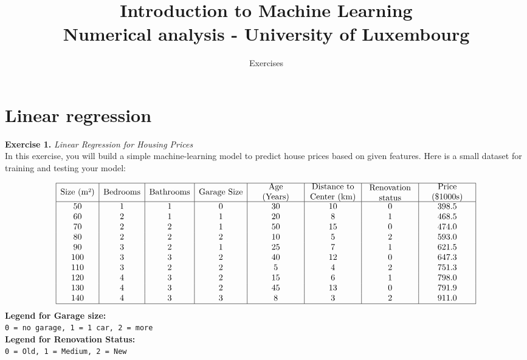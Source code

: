 \documentclass{article}
\title{Introduction to Machine Learning \\[1ex] \large Numerical analysis - University of Luxembourg}
\author{Exercises}
\date{}
\begin{document}
\maketitle


\section*{Linear regression}

\noindent \textbf{Exercise 1.} \textit{Linear Regression for Housing Prices} \\

In this exercise, you will build a simple machine-learning model to predict house prices based on given features. Here is a small dataset for training and testing your model:

\[
\begin{array}{|c|c|c|c|c|c|c|c|}
\hline
\text{Size (m²)} & \text{Bedrooms} & \text{Bathrooms} & \text{Garage Size} & \parbox[c]{2cm}{\centering Age \\ (Years)} & 
\parbox[c]{2cm}{\centering Distance to\\ Center (km)} & \parbox[c]{2cm}{\centering Renovation\\ status} & \parbox[c]{2cm}{\centering Price\\ (\$1000s)} \\
\hline
50  & 1 & 1 & 0 & 30 & 10 & 0 & 398.5  \\
60  & 2 & 1 & 1 & 20 & 8  & 1 & 468.5  \\
70  & 2 & 2 & 1 & 50 & 15 & 0 & 474.0  \\
80  & 2 & 2 & 2 & 10 & 5  & 2 & 593.0  \\
90  & 3 & 2 & 1 & 25 & 7  & 1 & 621.5  \\
100 & 3 & 3 & 2 & 40 & 12 & 0 & 647.3  \\
110 & 3 & 2 & 2 & 5  & 4  & 2 & 751.3  \\
120 & 4 & 3 & 2 & 15 & 6  & 1 & 798.0  \\
130 & 4 & 3 & 2 & 45 & 13 & 0 & 791.9  \\
140 & 4 & 3 & 3 & 8  & 3  & 2 & 911.0  \\
\hline
\end{array}
\]
%
\textbf{Legend for Garage size:} \\
\texttt{0 = no garage, 1 = 1 car, 2 = more} \\
%
\textbf{Legend for Renovation Status:} \\
\texttt{0 = Old, 1 = Medium, 2 = New}
\\
\end{document}
